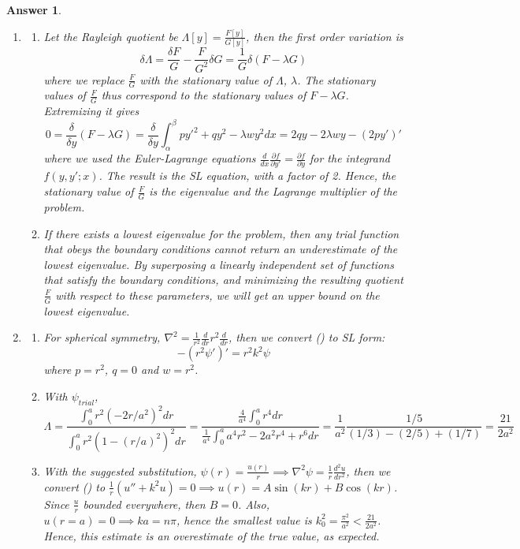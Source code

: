 \documentclass[a4paper]{article}
\newtheorem{ans}{Answer}[section]
\theoremstyle{new}
\begin{document}
\begin{ans}\leavevmode
\begin{enumerate}[label=(\alph*)]
\item
\begin{enumerate}[label=(\roman*)]
\item Let the Rayleigh quotient be $\Lambda[y]=\frac{F[y]}{G[y]}$, then the first order variation is
$$\delta\Lambda=\frac{\delta F}{G}-\frac{F}{G^2}\delta G=\frac{1}{G}\delta(F-\lambda G)$$
where we replace $\frac{F}{G}$ with the stationary value of $\Lambda$, $\lambda$. The stationary values of $\frac{F}{G}$ thus correspond to the stationary values of $F-\lambda G$. Extremizing it gives
$$0=\frac{\delta}{\delta y}(F-\lambda G)=\frac{\delta}{\delta y}\int_\alpha^\beta py'^2+qy^2-\lambda wy^2dx=2qy-2\lambda wy-(2py')'$$
where we used the Euler-Lagrange equations $\frac{d}{dx}\frac{\partial f}{\partial y'}=\frac{\partial f}{\partial y}$ for the integrand $f(y,y';x)$. The result is the SL equation, with a factor of 2. Hence, the stationary value of $\frac{F}{G}$ is the eigenvalue and the Lagrange multiplier of the problem.
\item If there exists a lowest eigenvalue for the problem, then any trial function that obeys the boundary conditions cannot return an underestimate of the lowest eigenvalue. By superposing a linearly independent set of functions that satisfy the boundary conditions, and minimizing the resulting quotient $\frac{F}{G}$ with respect to these parameters, we will get an upper bound on the lowest eigenvalue.
\end{enumerate}
\item
\begin{enumerate}[label=(\roman*)]
\item For spherical symmetry, $\nabla^2=\frac{1}{r^2}\frac{d}{dr}r^2\frac{d}{dr}$, then we convert (\dag) to SL form:
$$-(r^2\psi')'=r^2k^2\psi$$
where $p=r^2$, $q=0$ and $w=r^2$.
\item With $\psi_{trial}$,
$$\Lambda=\frac{\int_0^a r^2(-2r/a^2)^2dr}{\int_0^ar^2(1-(r/a)^2)^2dr}=\frac{\frac{4}{a^4}\int_0^ar^4dr}{\frac{1}{a^4}\int_0^aa^4r^2-2a^2r^4+r^6dr}=\frac{1}{a^2}\frac{1/5}{(1/3)-(2/5)+(1/7)}=\frac{21}{2a^2}$$
\item With the suggested substitution, $\psi(r)=\frac{u(r)}{r}\implies\nabla^2\psi=\frac{1}{r}\frac{d^2u}{dr^2}$, then we convert (\dag) to $\frac{1}{r}(u''+k^2u)=0\implies u(r)=A\sin(kr)+B\cos(kr)$. Since $\frac{u}{r}$ bounded everywhere, then $B=0$. Also, $u(r=a)=0\implies ka=n\pi$, hence the smallest value is $k_0^2=\frac{\pi^2}{a^2}<\frac{21}{2a^2}$. Hence, this estimate is an overestimate of the true value, as expected.
\end{enumerate}
\end{enumerate}
\end{ans}
\newpage
\end{document}

